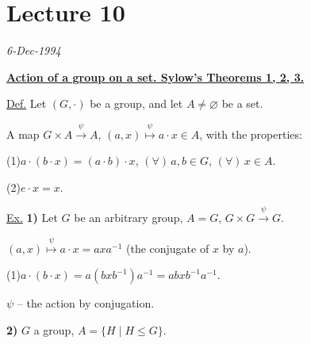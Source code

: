
\clearpage
\section{Lecture 10}

\begin{center}
\end{center}
\begin{flushright}
\textit{6-Dec-1994}
\end{flushright}

\bigskip
\noindent\underline{\textbf{Action of a group on a set. Sylow's Theorems 1, 2, 3.}}

\bigskip
\noindent\underline{Def.} Let $(G,\cdot)$ be a group, and let $A\neq\varnothing$ be a set.

\noindent A map $G\times A\xrightarrow{\ \psi\ } A$,
\quad $(a,x)\overset{\psi}{\longmapsto}a\cdot x\in A$, with the properties:

\bigskip
\noindent (1)\quad $a\cdot(b\cdot x)=(a\cdot b)\cdot x$,
\quad $(\forall)\,a,b\in G$, \quad $(\forall)\,x\in A$.

\medskip
\noindent (2)\quad $e\cdot x=x$.

\bigskip
\noindent\underline{Ex.} \textbf{1)} Let $G$ be an arbitrary group, $A=G$,
\quad $G\times G\xrightarrow{\ \psi\ }G$.

\noindent $(a,x)\overset{\psi}{\longmapsto}a\cdot x=axa^{-1}$
(the conjugate of $x$ by $a$).

\bigskip
\noindent (1)\quad $a\cdot(b\cdot x)=a(bxb^{-1})a^{-1}=abxb^{-1}a^{-1}$.

\medskip
\begin{center}
\end{center}

\noindent $\psi$ -- the action by conjugation.

\bigskip
\noindent\textbf{2)} $G$ a group, \quad $A=\{H\mid H\leq G\}$.

